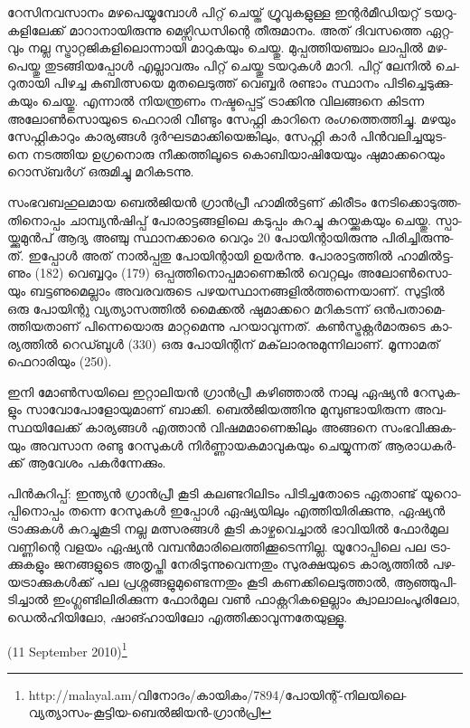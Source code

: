 ­റേ­സി­ന­വ­സാ­നം മഴ­പെ­യ്യു­മ്പോള്‍ പി­റ്റ് ചെ­യ്ത് ഗ്രൂ­വു­ക­ളു­ള്ള ഇന്റര്‍­മീ­ഡി­യ­റ്റ് ടയ­റു­ക­ളി­ലേ­ക്ക് മാ­റാ­നാ­യി­രു­ന്നു 
മെ­ഴ്സി­ഡ­സി­ന്റെ തീ­രു­മാ­നം. അത് ദി­വ­സ­ത്തെ ഏറ്റ­വും നല്ല സ്ട്രാ­റ്റ­ജി­ക­ളി­ലൊ­ന്നാ­യി മാ­റു­ക­യും ചെ­യ്തു. മു­പ്പ­ത്തി­യ­ഞ്ചാം 
ലാ­പ്പില്‍ മഴ­പെ­യ്തു തു­ട­ങ്ങി­യ­പ്പോള്‍ എല്ലാ­വ­രും പി­റ്റ് ചെ­യ്തു ടയ­റു­കള്‍ മാ­റി. പി­റ്റ് ലേ­നില്‍ ചെ­റു­താ­യി പി­ഴ­ച്ച കു­ബി­ത്സ­യെ 
മു­ത­ലെ­ടു­ത്ത് വെ­ബ്ബര്‍ രണ്ടാം സ്ഥാ­നം പി­ടി­ച്ചെ­ടു­ക്കു­ക­യും ചെ­യ്തു. എന്നാല്‍ നി­യ­ന്ത്ര­ണം നഷ്ട­പ്പെ­ട്ട് ട്രാ­ക്കി­നു വി­ല­ങ്ങ­നെ 
കി­ട­ന്ന അലോണ്‍­സൊ­യു­ടെ ­ഫെ­റാ­രി­ വീ­ണ്ടും സേ­ഫ്റ്റി കാ­റി­നെ രം­ഗ­ത്തെ­ത്തി­ച്ചു. മഴ­യും സേ­ഫ്റ്റി­കാ­റും കാ­ര്യ­ങ്ങള്‍ 
ദുര്‍­ഘ­ട­മാ­ക്കി­യെ­ങ്കി­ലും, സേ­ഫ്റ്റി കാര്‍ പിന്‍­വ­ലി­ച്ച­യു­ട­നെ നട­ത്തിയ ഉഗ്ര­നൊ­രു നീ­ക്ക­ത്തി­ലൂ­ടെ കൊ­ബി­യാ­ഷി­യേ­യും 
ഷു­മാ­ക്ക­റെ­യും റൊ­സ്ബര്‍­ഗ് ഒരു­മി­ച്ചു മറി­ക­ട­ന്നു­.

­സം­ഭ­വ­ബ­ഹു­ല­മായ ­ബെല്‍­ജി­യന്‍ ഗ്രാന്‍­പ്രീ­ ഹാ­മില്‍­ട്ട­ണ് കി­രീ­ടം നേ­ടി­ക്കൊ­ടു­ത്ത­തി­നൊ­പ്പം ചാ­മ്പ്യന്‍­ഷി­പ്പ് 
പോ­രാ­ട്ട­ങ്ങ­ളി­ലെ കടു­പ്പം കു­റ­ച്ചു കു­റ­യ്ക്കു­ക­യും ചെ­യ്തു. സ്പാ­യ്ക്കു­മുന്‍­പ് ആദ്യ അഞ്ചു സ്ഥാ­ന­ക്കാ­രെ വെ­റും 20 പോ­യി­ന്റാ­യി­രു­ന്നു 
പി­രി­ച്ചി­രു­ന്നു­ത്. ഇപ്പോള്‍ അത് നാല്‍­പ്പ­തു പോ­യി­ന്റാ­യി ഉയര്‍­ന്നു. പോ­രാ­ട്ട­ത്തില്‍ ഹാ­മില്‍­ട്ട­ണും ­(182) വെ­ബ്ബ­റും ­(179) 
ഒപ്പ­ത്തി­നൊ­പ്പ­മാ­ണെ­ങ്കില്‍ വെ­റ്റ­ലും അലോണ്‍­സൊ­യും ബട്ട­ണു­മെ­ല്ലാം അവ­ര­വ­രു­ടെ പഴ­യ­സ്ഥാ­ന­ങ്ങ­ളില്‍­ത്ത­ന്നെ­യാ­ണ്.
സു­ട്ടില്‍ ഒരു പോ­യി­ന്റു വ്യ­ത്യാ­സ­ത്തില്‍ മൈ­ക്കല്‍ ഷു­മാ­ക്ക­റെ മറി­ക­ട­ന്ന് ഒന്‍­പ­താ­മെ­ത്തി­യ­താ­ണ് പി­ന്നെ­യൊ­രു 
മാ­റ്റ­മെ­ന്നു പറ­യാ­വു­ന്ന­ത്. കണ്‍­സ്ട്ര­ക്റ്റര്‍­മാ­രു­ടെ കാ­ര്യ­ത്തില്‍ റെ­ഡ്ബുള്‍ (330) ഒരു പോ­യി­ന്റി­ന് മക്‌­ലാ­ര­നു­മു­ന്നി­ലാ­ണ്. 
മൂ­ന്നാ­മ­ത് ഫെ­റാ­രി­യും ­(250).

ഇ­നി മോണ്‍­സ­യി­ലെ ഇറ്റാ­ലി­യന്‍ ഗ്രാന്‍­പ്രീ കഴി­ഞ്ഞാല്‍ നാ­ലു ഏഷ്യന്‍ റേ­സു­ക­ളും സാ­വോ­പോ­ളോ­യു­മാ­ണ് ബാ­ക്കി. 
ബെല്‍­ജി­യ­ത്തി­നു മു­മ്പു­ണ്ടാ­യി­രു­ന്ന അവ­സ്ഥ­യി­ലേ­ക്ക് കാ­ര്യ­ങ്ങള്‍ എത്താന്‍ വി­ഷ­മ­മാ­ണെ­ങ്കി­ലും അങ്ങ­നെ 
സം­ഭ­വി­ക്കു­ക­യും അവ­സാന രണ്ടു റേ­സു­കള്‍ നിര്‍­ണ്ണാ­യ­ക­മാ­വു­ക­യും ചെ­യ്യു­ന്ന­ത് ആരാ­ധ­കര്‍­ക്ക് ആവേ­ശം 
പകര്‍­ന്നേ­ക്കും­.

­പിന്‍­കു­റി­പ്പ്: ഇന്ത്യന്‍ ഗ്രാന്‍­പ്രീ കൂ­ടി കല­ണ്ട­റി­ലി­ടം പി­ടി­ച്ച­തോ­ടെ ഏതാ­ണ്ട് യൂ­റൊ­പ്പി­നൊ­പ്പം തന്നെ റേ­സു­കള്‍ ഇപ്പോള്‍ 
ഏഷ്യ­യി­ലും എത്തി­യി­രി­ക്കു­ന്നു, ഏഷ്യന്‍ ട്രാ­ക്കു­കള്‍ കു­റ­ച്ചു­കൂ­ടി നല്ല മത്സ­ര­ങ്ങള്‍ കൂ­ടി കാ­ഴ്ച­വെ­ച്ചാല്‍ ഭാ­വി­യില്‍ ഫോര്‍­മുല 
വണ്ണി­ന്റെ വള­യം ഏഷ്യന്‍ വമ്പന്‍­മാ­രി­ലെ­ത്തി­ക്കൂ­ടെ­ന്നി­ല്ല. യൂ­റോ­പ്പി­ലെ പല ട്രാ­ക്കു­ക­ളും ജന­ങ്ങ­ളു­ടെ അതൃ­പ്തി 
നേ­രി­ടു­ന്നു­വെ­ന്ന­തും സു­ര­ക്ഷ­യു­ടെ കാ­ര്യ­ത്തില്‍ പഴ­യ­ട്രാ­ക്കു­കള്‍­ക്ക് പല പ്ര­ശ്ന­ങ്ങ­ളു­മു­ണ്ടെ­ന്ന­തും കൂ­ടി കണ­ക്കി­ലെ­ടു­ത്താല്‍,
ആഞ്ഞു­പി­ടി­ച്ചാല്‍ ഇം­ഗ്ല­ണ്ടി­ലി­രി­ക്കു­ന്ന ഫോര്‍­മുല വണ്‍ ഫാ­ക്റ്റ­റി­ക­ളെ­ല്ലാം ക്വാ­ലാ­ലം­പൂ­രി­ലോ, ഡെല്‍­ഹി­യി­ലോ­,­ 
ഷാ­ങ്ഹാ­യി­ലോ എത്തി­ക്കാ­വു­ന്ന­തേ­യു­ള്ളൂ­.

(11 September 2010)\footnote{http://malayal.am/വിനോദം/കായികം/7894/പോയിന്റ്-നിലയിലെ-വ്യത്യാസം-കൂട്ടിയ-ബെല്‍ജിയന്‍-ഗ്രാന്‍പ്രി}

\newpage
